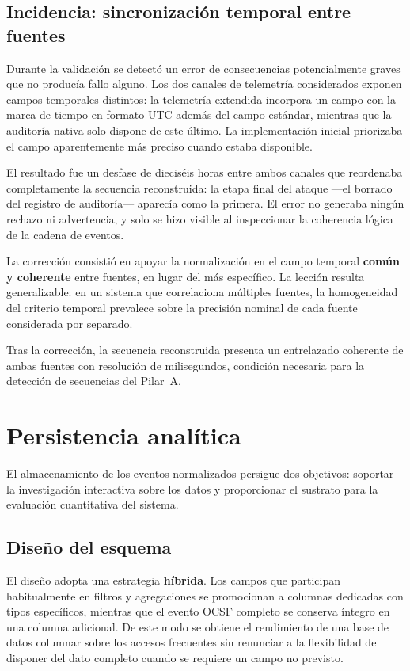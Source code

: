 \subsection{Incidencia: sincronización temporal entre fuentes}
\label{sec:incidencia_temporal}

Durante la validación se detectó un error de consecuencias potencialmente graves que no
producía fallo alguno. Los dos canales de telemetría considerados exponen campos temporales
distintos: la telemetría extendida incorpora un campo con la marca de tiempo en formato UTC
además del campo estándar, mientras que la auditoría nativa solo dispone de este último. La
implementación inicial priorizaba el campo aparentemente más preciso cuando estaba
disponible.

El resultado fue un desfase de dieciséis horas entre ambos canales que reordenaba
completamente la secuencia reconstruida: la etapa final del ataque —el borrado del registro de
auditoría— aparecía como la primera. El error no generaba ningún rechazo ni advertencia, y
solo se hizo visible al inspeccionar la coherencia lógica de la cadena de eventos.

La corrección consistió en apoyar la normalización en el campo temporal \textbf{común y
coherente} entre fuentes, en lugar del más específico. La lección resulta generalizable: en un
sistema que correlaciona múltiples fuentes, la homogeneidad del criterio temporal prevalece
sobre la precisión nominal de cada fuente considerada por separado.

Tras la corrección, la secuencia reconstruida presenta un entrelazado coherente de ambas
fuentes con resolución de milisegundos, condición necesaria para la detección de secuencias
del Pilar~A.

\section{Persistencia analítica}

El almacenamiento de los eventos normalizados persigue dos objetivos: soportar la
investigación interactiva sobre los datos y proporcionar el sustrato para la evaluación
cuantitativa del sistema.

\subsection{Diseño del esquema}

El diseño adopta una estrategia \textbf{híbrida}. Los campos que participan habitualmente en
filtros y agregaciones se promocionan a columnas dedicadas con tipos específicos, mientras que
el evento OCSF completo se conserva íntegro en una columna adicional. De este modo se obtiene
el rendimiento de una base de datos columnar sobre los accesos frecuentes sin renunciar a la
flexibilidad de disponer del dato completo cuando se requiere un campo no previsto.

